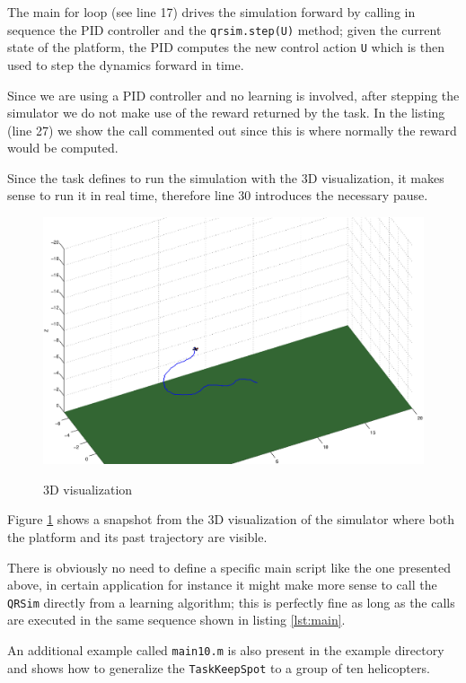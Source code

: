 \documentclass[a4paper,11pt]{report}
\newcommand{\snamettt}{\texttt{QRSim}\xspace}
\begin{document}
The main for loop (see line 17) drives the simulation forward by calling in sequence the PID controller and the \texttt{qrsim.step(U)} method; given the current state of the platform, the PID computes the new control action  \texttt{U} which is then used to step the dynamics forward in time.

Since we are using a PID controller and no learning is involved, after stepping the simulator we do not make use of the reward returned by the task. In the listing (line 27) we show the call commented out since this is where normally the reward would be computed.

Since the task defines to run the simulation with the 3D visualization, it makes sense to run it in real time, therefore line 30 introduces the necessary pause.  


\begin{figure}
\begin{center}
\label{fig:3d}
\includegraphics[width=13cm]{./3d.eps}
 \caption{3D visualization}
\end{center}
\end{figure}

Figure \ref{fig:3d} shows a snapshot from the 3D visualization of the simulator where both the platform and its past trajectory are visible.

There is obviously no need to define a specific main script like the one presented above, in certain application for instance it might make more sense to call the \snamettt directly from  a learning algorithm; this is perfectly fine as long as the calls are executed in the same sequence shown in listing \ref{lst:main}.

An additional example called \texttt{main10.m} is also present in the example directory and shows how to generalize the \texttt{TaskKeepSpot} to a group of ten helicopters.
\end{document}
